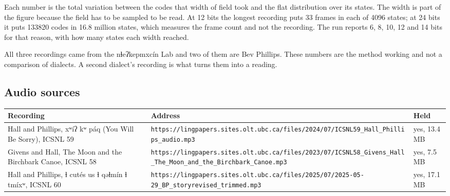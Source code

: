 Each number is the total variation between the codes that width of field took and the flat distribution over its states. The width is part of the figure because the field has to be sampled to be read. At 12 bits the longest recording puts 33 frames in each of 4096 states; at 24 bits it puts 133820 codes in 16.8 million states, which measures the frame count and not the recording. The run reports 6, 8, 10, 12 and 14 bits for that reason, with how many states each width reached.

All three recordings came from the nɬeʔkepmxcín Lab and two of them are Bev Phillips. These numbers are the method working and not a comparison of dialects. A second dialect's recording is what turns them into a reading.

\subsection{Audio sources}

\tiny
\setlength{\tabcolsep}{2pt}
\begin{longtable}{@{}>{\raggedright\arraybackslash}p{}>{\raggedright\arraybackslash}p{}>{\raggedright\arraybackslash}p{}@{}}
\toprule
Recording & Address & Held \\
\midrule
Hall and Phillips, xʷíʔ kʷ páq (You Will Be Sorry), ICSNL 59 & \texttt{https:/\allowbreak{}/\allowbreak{}lingpapers.\allowbreak{}sites.\allowbreak{}olt.\allowbreak{}ubc.\allowbreak{}ca/\allowbreak{}files/\allowbreak{}2024/\allowbreak{}07/\allowbreak{}ICSNL59\_\allowbreak{}Hall\_\allowbreak{}Phillips\_\allowbreak{}audio.\allowbreak{}mp3} & yes, 13.4 MB \\
Givens and Hall, The Moon and the Birchbark Canoe, ICSNL 58 & \texttt{https:/\allowbreak{}/\allowbreak{}lingpapers.\allowbreak{}sites.\allowbreak{}olt.\allowbreak{}ubc.\allowbreak{}ca/\allowbreak{}files/\allowbreak{}2023/\allowbreak{}07/\allowbreak{}ICSNL58\_\allowbreak{}Givens\_\allowbreak{}Hall\_\allowbreak{}The\_\allowbreak{}Moon\_\allowbreak{}and\_\allowbreak{}the\_\allowbreak{}Birchbark\_\allowbreak{}Canoe.\allowbreak{}mp3} & yes, 7.5 MB \\
Hall and Phillips, ɬ cutés us ɬ qəɬmín ɬ tmíxʷ, ICSNL 60 & \texttt{https:/\allowbreak{}/\allowbreak{}lingpapers.\allowbreak{}sites.\allowbreak{}olt.\allowbreak{}ubc.\allowbreak{}ca/\allowbreak{}files/\allowbreak{}2025/\allowbreak{}07/\allowbreak{}2025-\allowbreak{}05-\allowbreak{}29\_\allowbreak{}BP\_\allowbreak{}storyrevised\_\allowbreak{}trimmed.\allowbreak{}mp3} & yes, 17.1 MB \\
\bottomrule
\end{longtable}
\normalsize

